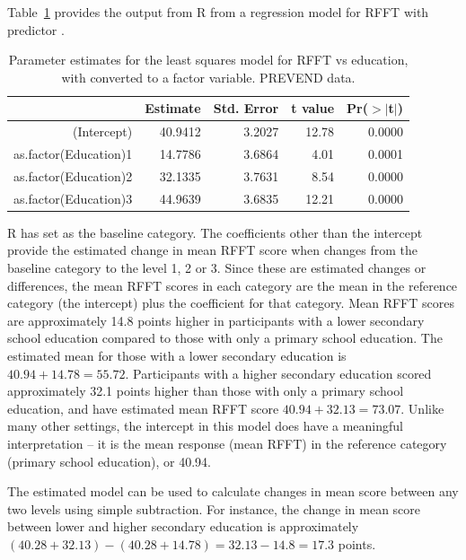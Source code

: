 Table~\ref{prevendRFFTEducationRegression} provides the output from \textsf{R} from a regression model for RFFT with predictor .  
\begin{table}[ht]
\centering
\begin{tabular}{rrrrr}
  \hline
 & Estimate & Std. Error & t value & Pr($>$$|$t$|$) \\ 
  \hline
(Intercept) & 40.9412 & 3.2027 & 12.78 & 0.0000 \\ 
  as.factor(Education)1 & 14.7786 & 3.6864 & 4.01 & 0.0001 \\ 
  as.factor(Education)2 & 32.1335 & 3.7631 & 8.54 & 0.0000 \\ 
  as.factor(Education)3 & 44.9639 & 3.6835 & 12.21 & 0.0000 \\ 
   \hline
\end{tabular}
\caption{{Parameter estimates for the least squares 
       model for RFFT vs education, with 
        converted to a factor variable. 
       PREVEND data.} 
\label{prevendRFFTEducationRegression}}
\end{table}
\textsf{R} has set  as the baseline category. The coefficients other than the intercept provide the estimated change in mean RFFT score when  changes from the baseline category to the level 1, 2 or 3. Since these are estimated changes or differences, the mean RFFT scores in each category are the mean in the reference category (the intercept) plus the coefficient for that category. Mean RFFT scores are approximately 14.8 points higher in participants with a lower secondary school education compared to those with only a primary school education.  The estimated mean for those with a lower secondary education is $40.94 + 14.78 = 55.72$.  Participants with a higher secondary education scored approximately 32.1 points higher than those with only a primary school education, and have estimated mean RFFT score $40.94 + 32.13 = 73.07$.  Unlike many other settings, the intercept in this model does have a meaningful interpretation -- it is the mean response (mean RFFT) in the reference category (primary school education), or 40.94.

The estimated model can be used to calculate changes in mean score between any two levels using simple subtraction.  For instance, the change in mean score between lower and higher secondary education is approximately $(40.28 +32.13) - (40.28 +14.78) = 32.13 - 14.8 = 17.3$ points.


